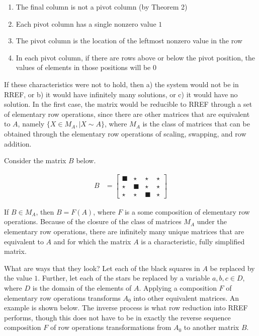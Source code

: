 \documentclass[10pt,letterpaper,final]{report}
\begin{document}
\begin{enumerate}
  \item The final column is not a pivot column (by Theorem 2)
  \item Each pivot column has a single nonzero value $1$
  \item The pivot column is the location of the leftmost nonzero value in the row
  \item In each pivot column, if there are rows above or below the pivot position, the values of elements in those positions will be $0$
\end{enumerate}

If these characteristics were not to hold, then a) the system would not be in RREF, or b) it would have infinitely many solutions, or c) it would have no solution. In the first case, the matrix would be reducible to RREF through a set of elementary row operations, since there are other matrices that are equivalent to $A$, namely $\{X \in M_A, \mid X \sim A\}$, where $M_A$ is the class of matrices that can be obtained through the elementary row operations of scaling, swapping, and row addition.

Consider the matrix $B$ below.

\begin{align*}
  B & =
  \left[\begin{array}{rrr|r}
      \blacksquare & \star        & \star        & \star \\
      \star        & \blacksquare & \star        & \star \\
      \star        & \star        & \blacksquare & \star
    \end{array}\right]
\end{align*}

If $B \in M_A$, then $B = F(A)$, where $F$ is a some composition of elementary row operations. Because of the closure of the class of matrices $M_A$ under the elementary row operations, there are infinitely many unique matrices that are equivalent to $A$ and for which the matrix $A$ is a characteristic, fully simplified matrix.

What are ways that they look? Let each of the black squares in $A$ be replaced by the value $1$. Further, let each of the stars be replaced by a variable $a,b,c \in D$, where $D$ is the domain of the elements of $A$. Applying a composition $F$ of elementary row operations transforms $A_0$ into other equivalent matrices. An example is shown below. The inverse process is what row reduction into RREF performs, though this does not have to be in exactly the reverse sequence composition $F$ of row operations transformations from $A_0$ to another matrix $B$.
\end{document}
